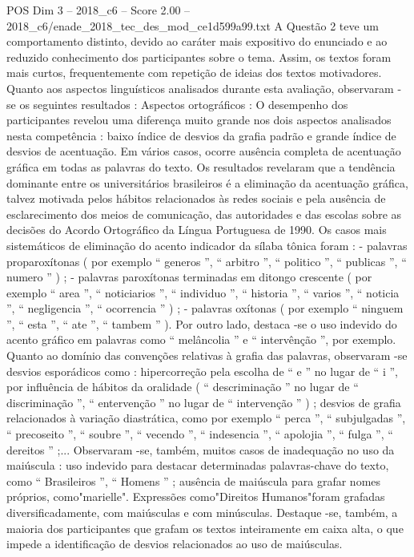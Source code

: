 \begin{textsample}{POS Dim 3 – 2018\_c6 – Score 2.00 – 2018\_c6/enade\_2018\_tec\_des\_mod\_ce1d599a99.txt}
A Questão 2 teve um comportamento distinto, devido ao caráter mais expositivo do enunciado e ao reduzido conhecimento dos participantes sobre o tema.
Assim, os textos foram mais curtos, frequentemente com repetição de ideias dos textos motivadores.
Quanto aos aspectos linguísticos analisados durante esta avaliação, observaram -se os seguintes resultados : Aspectos ortográficos : O desempenho dos participantes revelou uma diferença muito grande nos dois aspectos analisados nesta competência : baixo índice de desvios da grafia padrão e grande índice de desvios de acentuação.
Em vários casos, ocorre ausência completa de acentuação gráfica em todas as palavras do texto.
Os resultados revelaram que a tendência dominante entre os universitários brasileiros é a eliminação da acentuação gráfica, talvez motivada pelos hábitos relacionados às redes sociais e pela ausência de esclarecimento dos meios de comunicação, das autoridades e das escolas sobre as decisões do Acordo Ortográfico da Língua Portuguesa de 1990.
Os casos mais sistemáticos de eliminação do acento indicador da sílaba tônica foram : - palavras proparoxítonas ( por exemplo “ generos ”, “ arbitro ”, “ politico ”, “ publicas ”, “ numero ” ) ; - palavras paroxítonas terminadas em ditongo crescente ( por exemplo “ area ”, “ noticiarios ”, “ individuo ”, “ historia ”, “ varios ”, “ noticia ”, “ negligencia ”, “ ocorrencia ” ) ; - palavras oxítonas ( por exemplo “ ninguem ”, “ esta ”, “ ate ”, “ tambem ” ).
Por outro lado, destaca -se o uso indevido do acento gráfico em palavras como “ melâncolia ” e “ intervênção ”, por exemplo.
Quanto ao domínio das convenções relativas à grafia das palavras, observaram -se desvios esporádicos como : hipercorreção pela escolha de “ e ” no lugar de “ i ”, por influência de hábitos da oralidade ( “ descriminação ” no lugar de “ discriminação ”, “ entervenção ” no lugar de “ intervenção ” ) ; desvios de grafia relacionados à variação diastrática, como por exemplo “ perca ”, “ subjulgadas ”, “ precoseito ”, “ soubre ”, “ vecendo ”, “ indesencia ”, “ apolojia ”, “ fulga ”, “ dereitos ” ;...
Observaram -se, também, muitos casos de inadequação no uso da maiúscula : uso indevido para destacar determinadas palavras-chave do texto, como “ Brasileiros ”, “ Homens ” ; ausência de maiúscula para grafar nomes próprios, como"marielle".
Expressões como"Direitos Humanos"foram grafadas diversificadamente, com maiúsculas e com minúsculas.
Destaque -se, também, a maioria dos participantes que grafam os textos inteiramente em caixa alta, o que impede a identificação de desvios relacionados ao uso de maiúsculas.

\end{textsample}
